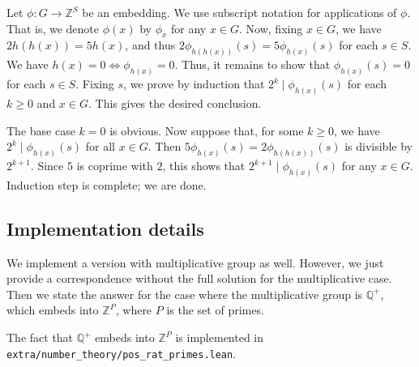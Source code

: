 \documentclass{article}
\newcommand{\Z}{\mathbb{Z}}
\newcommand{\Q}{\mathbb{Q}}
\begin{document}
Let $\phi : G \to \Z^S$ be an embedding.
We use subscript notation for applications of $\phi$.
That is, we denote $\phi(x)$ by $\phi_x$ for any $x \in G$.
Now, fixing $x \in G$, we have $2 h(h(x)) = 5 h(x)$, and thus $2 \phi_{h(h(x))}(s) = 5 \phi_{h(x)}(s)$ for each $s \in S$.
We have $h(x) = 0 \iff \phi_{h(x)} = 0$.
Thus, it remains to show that $\phi_{h(x)}(s) = 0$ for each $s \in S$.
Fixing $s$, we prove by induction that $2^k \mid \phi_{h(x)}(s)$ for each $k \geq 0$ and $x \in G$.
This gives the desired conclusion.

The base case $k = 0$ is obvious.
Now suppose that, for some $k \geq 0$, we have $2^k \mid \phi_{h(x)}(s)$ for all $x \in G$.
Then $5 \phi_{h(x)}(s) = 2 \phi_{h(h(x))}(s)$ is divisible by $2^{k + 1}$.
Since $5$ is coprime with $2$, this shows that $2^{k + 1} \mid  \phi_{h(x)}(s)$ for any $x \in G$.
Induction step is complete; we are done.



\subsection*{Implementation details}

We implement a version with multiplicative group as well.
However, we just provide a correspondence without the full solution for the multiplicative case.
Then we state the answer for the case where the multiplicative group is $\Q^+$, which embeds into $\Z^P$, where $P$ is the set of primes.

The fact that $\Q^+$ embeds into $\Z^P$ is implemented in \texttt{extra/number\_theory/pos\_rat\_primes.lean}.
\end{document}
